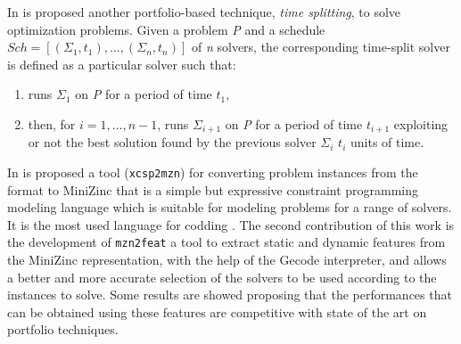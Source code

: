 In \cite{Amadini2014} is proposed another portfolio-based technique, \textit{time splitting}, to solve optimization problems. Given a problem \textit{P} and a schedule $Sch = \left[(\Sigma_1, t_1),\dots,(\Sigma_n, t_n)\right]$ of \textit{n} solvers, the corresponding time-split solver is defined as a particular solver such that:  
\begin{enumerate}[label=\alph*)]
\item runs $\Sigma_1$ on \textit{P} for a period of time $t_1$, 
\item then, for $i = 1,\dots, n-1$, runs $\Sigma_{i+1}$ on \textit{P} for a period of time $t_{i+1}$ exploiting or not the best solution found by the previous solver $\Sigma_i$ $t_i$ units of time.
\end{enumerate}




In \cite{Amadini} is proposed a tool (\texttt{xcsp2mzn}) for converting problem instances from the format  \cite{Committee} to {\sc MiniZinc} that is a simple but expressive constraint programming modeling language which is suitable for modeling problems for a range of solvers. It is the most used language for codding \csps{} \cite{Nethercote}. The second contribution of this work is the development of \texttt{mzn2feat} a tool to extract static and dynamic features from the {\sc MiniZinc} representation, with the help of the {\sc Gecode} interpreter, and allows a better and more accurate selection of the solvers to be used according to the instances to solve. Some results are showed proposing that the performances that can be obtained using these features are competitive with state of the art on \csp{} portfolio techniques. 


